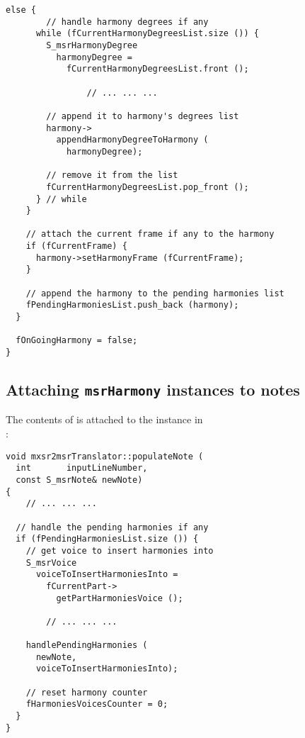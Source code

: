 \begin{lstlisting}[language=CPlusPlus]
    else {
    	// handle harmony degrees if any
      while (fCurrentHarmonyDegreesList.size ()) {
        S_msrHarmonyDegree
          harmonyDegree =
            fCurrentHarmonyDegreesList.front ();

				// ... ... ...

        // append it to harmony's degrees list
        harmony->
          appendHarmonyDegreeToHarmony (
            harmonyDegree);

        // remove it from the list
        fCurrentHarmonyDegreesList.pop_front ();
      } // while
    }

    // attach the current frame if any to the harmony
    if (fCurrentFrame) {
      harmony->setHarmonyFrame (fCurrentFrame);
    }

    // append the harmony to the pending harmonies list
    fPendingHarmoniesList.push_back (harmony);
  }

  fOnGoingHarmony = false;
}
\end{lstlisting}


\subsection{Attaching {\tt msrHarmony} instances to notes}

The contents of  is attached to the  instance in\\
:
\begin{lstlisting}[language=CPlusPlus]
void mxsr2msrTranslator::populateNote (
  int       inputLineNumber,
  const S_msrNote& newNote)
{
	// ... ... ...

  // handle the pending harmonies if any
  if (fPendingHarmoniesList.size ()) {
    // get voice to insert harmonies into
    S_msrVoice
      voiceToInsertHarmoniesInto =
        fCurrentPart->
          getPartHarmoniesVoice ();

		// ... ... ...

    handlePendingHarmonies (
      newNote,
      voiceToInsertHarmoniesInto);

    // reset harmony counter
    fHarmoniesVoicesCounter = 0;
  }
}
\end{lstlisting}


